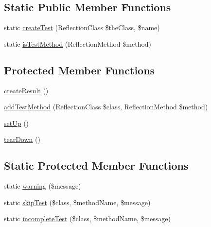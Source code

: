 \subsection*{Static Public Member Functions}
\begin{DoxyCompactItemize}
\item 
static \mbox{\hyperlink{class_p_h_p_unit___framework___test_suite_af96ca1c0b1be0abb3b9686a8010286d4}{create\+Test}} (Reflection\+Class \$the\+Class, \$name)
\item 
static \mbox{\hyperlink{class_p_h_p_unit___framework___test_suite_a4ef483825c4423bf677e37f104136e28}{is\+Test\+Method}} (Reflection\+Method \$method)
\end{DoxyCompactItemize}
\subsection*{Protected Member Functions}
\begin{DoxyCompactItemize}
\item 
\mbox{\hyperlink{class_p_h_p_unit___framework___test_suite_a3f3ab385dd8747091f1bdfbb11ed6eca}{create\+Result}} ()
\item 
\mbox{\hyperlink{class_p_h_p_unit___framework___test_suite_ae48cf09b98b8b0ab12a0203511827039}{add\+Test\+Method}} (Reflection\+Class \$class, Reflection\+Method \$method)
\item 
\mbox{\hyperlink{class_p_h_p_unit___framework___test_suite_a0bc688732d2b3b162ffebaf7812e78da}{set\+Up}} ()
\item 
\mbox{\hyperlink{class_p_h_p_unit___framework___test_suite_a80fe3d17e658907fc75346a0ec9d6fc7}{tear\+Down}} ()
\end{DoxyCompactItemize}
\subsection*{Static Protected Member Functions}
\begin{DoxyCompactItemize}
\item 
static \mbox{\hyperlink{class_p_h_p_unit___framework___test_suite_a72294fb153640124f6c5ce9fc4d59e1b}{warning}} (\$message)
\item 
static \mbox{\hyperlink{class_p_h_p_unit___framework___test_suite_aac8e6568a8d13955cc77452186ce67ba}{skip\+Test}} (\$class, \$method\+Name, \$message)
\item 
static \mbox{\hyperlink{class_p_h_p_unit___framework___test_suite_a983a623bdb32337f9f33bf313de3df76}{incomplete\+Test}} (\$class, \$method\+Name, \$message)
\end{DoxyCompactItemize}

